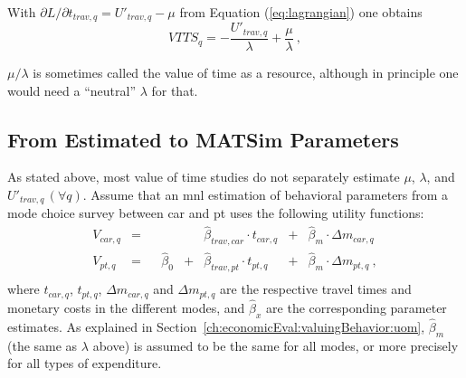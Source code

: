With $\partial L / \partial t_{trav,q} = U'_{trav,q} - \mu$ from Equation (\ref{eq:lagrangian}) one obtains
\begin{equation}
VTTS_q 
= - \frac{U'_{trav,q}}{\lambda} + \frac{\mu}{\lambda} \ ,
\label{eq:vot2}
\end{equation}

$\mu/\lambda$ is sometimes called the value of time as a resource, although in principle one would need a ``neutral'' $\lambda$ for that.




\subsection{From Estimated to MATSim Parameters}
\label{ch:economicEval:valuingBehavior:estimates2Matsim}

As stated above, most value of time studies do not separately estimate $\mu$, $\lambda$, and $U'_{trav,q} \, (\forall q)$. 
%
Assume that an \gls{mnl} estimation of behavioral parameters from a mode choice survey between car and \gls{pt} uses the following utility functions:
%
\begin{equation}
\begin{matrix}
V_{car,q} & =
&   &
&   & \hat{\beta}_{trav,car} \cdot t_{car,q}
& + & \hat{\beta}_{m} \cdot  \Delta{m_{car,q}} \\
%
V_{pt,q} & = 
&   & \hat{\beta}_{0}
& + & \hat{\beta}_{trav,pt} \cdot t_{pt,q}
& + & \hat{\beta}_{m} \cdot  \Delta{m_{pt,q}}  \ , \\
\end{matrix}
\label{eq:ch:economicEval:utilityTraveling}
\end{equation}
%
where $t_{car,q}$, $t_{pt,q}$, $\Delta{m_{car,q}}$ and $\Delta{m_{pt,q}}$  are the respective travel times and monetary costs in the different modes, and $\hat\beta_x$ are the corresponding parameter estimates.
%
As explained in Section~\ref{ch:economicEval:valuingBehavior:uom}, $\hat\beta_m$ (the same as $\lambda$ above) is assumed to be the same for all modes, or more precisely for all types of expenditure.


